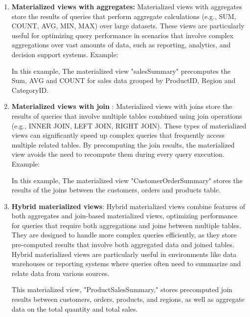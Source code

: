\begin{enumerate}[label=\alph*)]
    \item \textbf{Materialized views with aggregates:} Materialized views with aggregates store the results of queries that perform aggregate calculations (e.g., SUM, COUNT, AVG, MIN, MAX) over large datasets. These views are particularly useful for optimizing query performance in scenarios that involve complex aggregations over vast amounts of data, such as reporting, analytics, and decision support systems. Example:\vspace{.4cm}
    
    

    In this example, The materialized view "salesSummary" precomputes the Sum, AVG and COUNT for sales data grouped by ProductID, Region and CategoryID.

    \item \textbf{Materialized views with join }: Materialized views with joins store the results of queries that involve multiple tables combined using join operations (e.g., INNER JOIN, LEFT JOIN, RIGHT JOIN). These types of materialized views can significantly speed up complex queries that frequently access multiple related tables. By precomputing the join results, the materialized view avoids the need to recompute them during every query execution. Example: \vspace{.4cm}
    
    

    In this example, The materialized view "CustomerOrderSummary"
    stores the results of the joins between the customers, orders and products table.
    
    \item \textbf{Hybrid materialized views}: Hybrid materialized views combine features of both aggregates and join-based materialized views, optimizing performance for queries that require both aggregations and joins between multiple tables. They are designed to handle more complex queries efficiently, as they store pre-computed results that involve both aggregated data and joined tables. Hybrid materialized views are particularly useful in environments like data warehouses or reporting systems where queries often need to summarize and relate data from various sources. \vspace{.4cm}
    
     
    
This materialized view, "ProductSalesSummary," stores precomputed join results between customers, orders, products, and regions, as well as aggregate data on the total quantity and total sales.
    
\end{enumerate}

